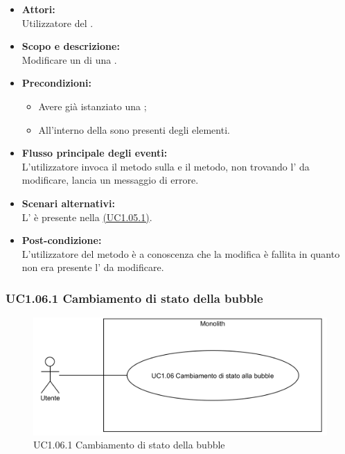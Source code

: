 \begin{itemize}
	\item \textbf{Attori:}
	\\Utilizzatore del .
	\item \textbf{Scopo e descrizione:} 
	\\Modificare un  di una .
	\item \textbf{Precondizioni:}
	\begin{itemize}
		\item Avere già istanziato una ;
		\item All'interno della  sono presenti degli elementi.
	\end{itemize}
	\item \textbf{Flusso principale degli eventi:}
	\\L'utilizzatore invoca il metodo sulla  e il metodo, non trovando l' da modificare, lancia un messaggio di errore.
	\item \textbf{Scenari alternativi:}
	\\L' è presente nella  \hyperref[UC1.05.1]{(UC1.05.1)}.
	\item \textbf{Post-condizione:}
	\\L'utilizzatore del metodo è a conoscenza che la modifica è fallita in quanto non era presente l' da modificare.
\end{itemize}

\subsubsection{UC1.06.1 Cambiamento di stato della bubble} \label{UC1.06.1}

\begin{figure}[H]
	\centering
	\includegraphics[width=15cm]{../../documenti/AnalisiDeiRequisiti/Diagrammi_img/uc1_06.png}
	\caption{UC1.06.1 Cambiamento di stato della bubble}
\end{figure}

